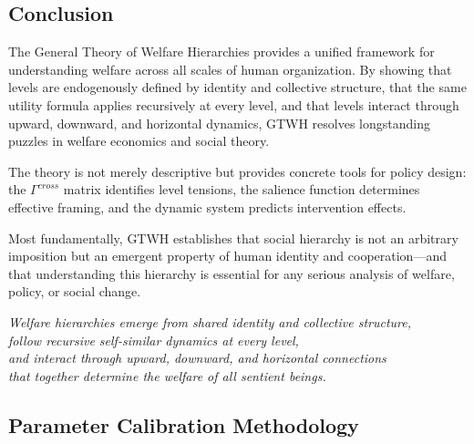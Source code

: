 \subsection{Conclusion}

The General Theory of Welfare Hierarchies provides a unified framework for 
understanding welfare across all scales of human organization. By showing 
that levels are endogenously defined by identity and collective structure, 
that the same utility formula applies recursively at every level, and that 
levels interact through upward, downward, and horizontal dynamics, GTWH 
resolves longstanding puzzles in welfare economics and social theory.

The theory is not merely descriptive but provides concrete tools for policy 
design: the $\Gamma^{cross}$ matrix identifies level tensions, the salience 
function determines effective framing, and the dynamic system predicts 
intervention effects.

Most fundamentally, GTWH establishes that social hierarchy is not an 
arbitrary imposition but an emergent property of human identity and 
cooperation---and that understanding this hierarchy is essential for 
any serious analysis of welfare, policy, or social change.

\begin{tcolorbox}[colback=gray!5!white, colframe=gray!75!black, title=The GTWH in One Sentence]
\centering
\textit{Welfare hierarchies emerge from shared identity and collective structure, \\
follow recursive self-similar dynamics at every level, \\
and interact through upward, downward, and horizontal connections \\
that together determine the welfare of all sentient beings.}
\end{tcolorbox}



\subsection{Parameter Calibration Methodology}

